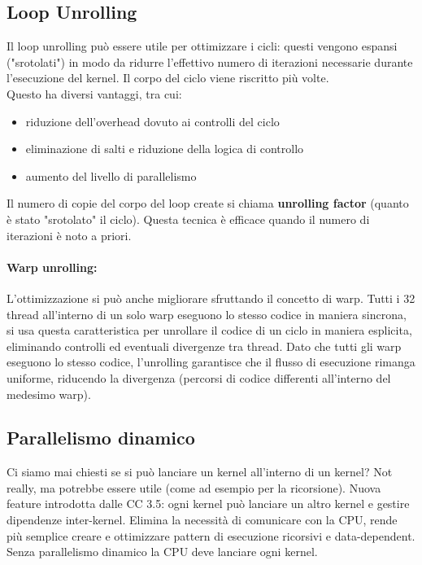 \newpage

\subsection{Loop Unrolling}
Il loop unrolling può essere utile per ottimizzare i cicli: questi vengono espansi ("srotolati") in modo da ridurre l'effettivo numero di iterazioni necessarie durante l'esecuzione del kernel. Il corpo del ciclo viene riscritto più volte. \\

Questo ha diversi vantaggi, tra cui: 
\begin{itemize}
	\item riduzione dell'overhead dovuto ai controlli del ciclo
	\item eliminazione di salti e riduzione della logica di controllo 
	\item aumento del livello di parallelismo
\end{itemize}

Il numero di copie del corpo del loop create si chiama \textbf{unrolling factor} (quanto è stato "srotolato" il ciclo). Questa tecnica è efficace quando il numero di iterazioni è noto a priori.\\

\paragraph{Warp unrolling:} L'ottimizzazione si può anche migliorare sfruttando il concetto di warp. Tutti i 32 thread all'interno di un solo warp eseguono lo stesso codice in maniera sincrona, si usa questa caratteristica per unrollare il codice di un ciclo in maniera esplicita, eliminando controlli ed eventuali divergenze tra thread. Dato che tutti gli warp eseguono lo stesso codice, l'unrolling garantisce che il flusso di esecuzione rimanga uniforme, riducendo la divergenza (percorsi di codice differenti all'interno del medesimo warp). \\


\subsection{Parallelismo dinamico}

Ci siamo mai chiesti se si può lanciare un kernel all'interno di un kernel? Not really, ma potrebbe essere utile (come ad esempio per la ricorsione). Nuova feature introdotta dalle CC 3.5: ogni kernel può lanciare un altro kernel e gestire dipendenze inter-kernel. Elimina la necessità di comunicare con la CPU, rende più semplice creare e ottimizzare pattern di esecuzione ricorsivi e data-dependent. Senza parallelismo dinamico la CPU deve lanciare ogni kernel.\\

